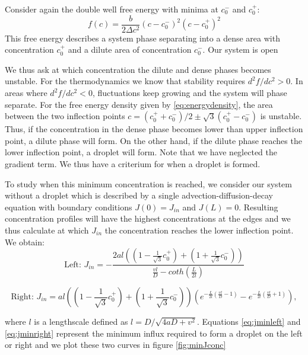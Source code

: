 \documentclass{Dissertate}
\begin{document}
Consider again the double well free energy with minima at \(c_0^-\) and
\(c_0^+\): \begin{equation}
f(c) = \frac{b}{2\Delta c^2}(c-c_0^-)^2(c-c_0^+)^2
\label{eq:energydensity}\end{equation} This free energy describes a
system phase separating into a dense area with concentration \(c_0^+\)
and a dilute area of concentration \(c_0^-\). Our system is open

We thus ask at which concentration the dilute and dense phases becomes
unstable. For the thermodynamics we know that stability requires
\(d^2f/dc^2>0\). In areas where \(d^2f/dc^2<0\), fluctuations keep
growing and the system will phase separate. For the free energy density
given by \ref{eq:energydensity}, the area between the two inflection
points \(c=(c_0^++c_0^-)/2\pm\sqrt{3}(c_0^+-c_0^-)\) is unstable. Thus,
if the concentration in the dense phase becomes lower than upper
inflection point, a dilute phase will form. On the other hand, if the
dilute phase reaches the lower inflection point, a droplet will form.
Note that we have neglected the gradient term. We thus have a criterium
for when a droplet is formed.

To study when this minimum concentration is reached, we consider our
system without a droplet which is described by a single
advection-diffusion-decay equation with boundary conditions
\(J(0)=J_{in}\) and \(J(L)=0\). Resulting concentration profiles will
have the highest concentrations at the edges and we thus calculate at
which \(J_{in}\) the concentration reaches the lower inflection point.
We obtain: \begin{equation}
\text{Left:  }J_{in} = - \frac{ 2al((1-\frac{1}{\sqrt{3}}c_0^+)+(1+\frac{1}{\sqrt{3}}c_0^-))}{\frac{vl}{D}-coth(\frac{L}{2l})}
\label{eq:jminleft}\end{equation}

\begin{equation}
\text{Right: } J_{in} =al((1-\frac{1}{\sqrt{3}}c_0^+)+(1+\frac{1}{\sqrt{3}}c_0^-))\left(e^{-\frac{L}{2l}(\frac{vl}{D}-1)}-e^{-\frac{L}{2l}(\frac{vl}{D}+1)}\right),
\label{eq:jminright}\end{equation}

where \(l\) is a lengthscale defined as \(l=D/\sqrt{4aD+v^2}\).
Equations \ref{eq:jminleft} and \ref{eq:jminright} represent the
minimum influx required to form a droplet on the left or right and we
plot these two curves in figure \ref{fig:minJconc}
\end{document}
